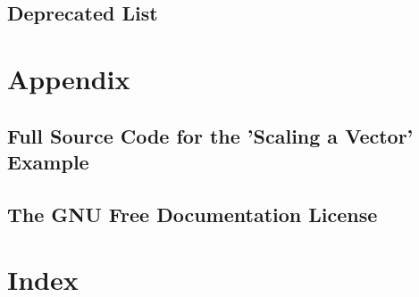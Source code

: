 

















































\chapter{Deprecated List}
\label{deprecated}
\hypertarget{deprecated}{}


\part{Appendix}

\chapter{Full Source Code for the ’Scaling a Vector’ Example}
\label{FullSourceCodeVectorScal}
\hypertarget{FullSourceCodeVectorScal}{}


\chapter{The GNU Free Documentation License}
\label{GNUFreeDocumentationLicense}
\hypertarget{GNUFreeDocumentationLicense}{}


\part{Index}
\printindex


